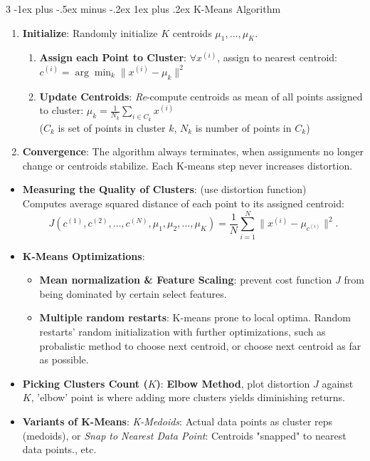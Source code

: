 \documentclass[a4paper, 9pt, landscape]{article}
\makeatletter
\renewcommand{\subsubsection}{\@startsection{subsubsection}{3}{0mm}%
                                {-1ex plus -.5ex minus -.2ex}%
                                {1ex plus .2ex}%
                                {\normalfont\small\bfseries}}
\makeatother
\begin{document}
\begin{multicols*}{3}
\subsubsection{ K-Means Algorithm}
\begin{enumerate}[itemsep=-1pt]
    \item \textbf{Initialize}: Randomly initialize $ K $ centroids $ \mu_1, \dots, \mu_K $.
    \begin{enumerate}[itemsep=1pt, leftmargin=2mm, topsep=0.5mm]
        \item \textbf{Assign each Point to Cluster}: $\forall  x^{(i)} $, assign to nearest centroid: 
        $c^{(i)} = \arg\min_{k} \|x^{(i)} - \mu_k\|^2$ 
        \item \textbf{Update Centroids}: \textit{Re}-compute centroids as mean of all points assigned to cluster: 
        $\mu_k = \frac{1}{N_k} \sum_{i \in C_k} x^{(i)}$ \\
         {\scriptsize ($ C_k $ is set of points in cluster $ k $, $ N_k $ is number of points in $ C_k $)}
    \end{enumerate}
    \item \textbf{Convergence}: The algorithm always terminates, when assignments no longer change or centroids stabilize. Each K-means step never increases distortion.
\end{enumerate}

\begin{itemize}
\item \textbf{Measuring the Quality of Clusters}: (use distortion function) \\
Computes average squared distance of each point to its assigned centroid:
\[
J(c^{(1)}, c^{(2)}, \dots, c^{(N)}, \mu_1, \mu_2, \dots, \mu_K) = \frac{1}{N} \sum_{i=1}^N \|x^{(i)} - \mu_{c^{(i)}}\|^2.
\]
\item \textbf{K-Means Optimizations}: 
	\begin{itemize}
	\item \textbf{Mean normalization \& Feature Scaling}: prevent cost function $J$ from being dominated by certain select features.
	\item \textbf{Multiple random restarts}: K-means prone to local optima. Random restarts' random initialization with further optimizations, such as probalistic method to choose next centroid, or choose next centroid as far as possible.
	\end{itemize}
\item \textbf{Picking Clusters Count ($ K $)}: \textbf{Elbow Method}, plot distortion $ J $ against $ K $, 'elbow' point is where adding more clusters yields diminishing returns.
\item \textbf{Variants of K-Means}: \textit{K-Medoids}: Actual data points as cluster reps (medoids), or \textit{Snap to Nearest Data Point}: Centroids "snapped" to nearest data points., etc.
\end{itemize}


\end{multicols*}
\end{document}

